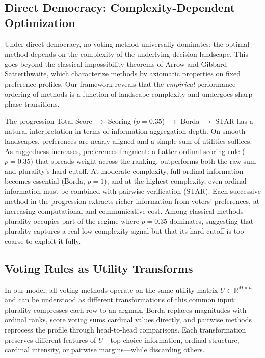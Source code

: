 
\subsection{Direct Democracy: Complexity-Dependent Optimization}

Under direct democracy, no voting method universally dominates: the optimal method depends on the complexity of the underlying decision landscape. This goes beyond the classical impossibility theorems of Arrow and Gibbard-Satterthwaite, which characterize methods by axiomatic properties on fixed preference profiles. Our framework reveals that the \emph{empirical} performance ordering of methods is a function of landscape complexity and undergoes sharp phase transitions.

The progression Total Score $\to$ Scoring ($p\!=\!0.35$) $\to$ Borda $\to$ STAR has a natural interpretation in terms of information aggregation depth. On smooth landscapes, preferences are nearly aligned and a simple sum of utilities suffices. As ruggedness increases, preferences fragment: a flatter ordinal scoring rule ($p\!=\!0.35$) that spreads weight across the ranking, outperforms both the raw sum and plurality's hard cutoff. At moderate complexity, full ordinal information becomes essential (Borda, $p\!=\!1$), and at the highest complexity, even ordinal information must be combined with pairwise verification (STAR). Each successive method in the progression extracts richer information from voters' preferences, at increasing computational and communicative cost. Among classical methods plurality occupies part of the regime where $p\!=\!0.35$ dominates, suggesting that plurality captures a real low-complexity signal but that its hard cutoff is too coarse to exploit it fully.

\subsection{Voting Rules as Utility Transforms}

In our model, all voting methods operate on the same utility matrix
$U \in \mathbb{R}^{M \times n}$ and can be understood as different
transformations of this common input: plurality compresses each row to an
argmax, Borda replaces magnitudes with ordinal ranks, score voting sums
cardinal values directly, and pairwise methods reprocess the profile through
head-to-head comparisons. Each transformation preserves different features of
$U$---top-choice information, ordinal structure, cardinal intensity, or pairwise
margins---while discarding others.

